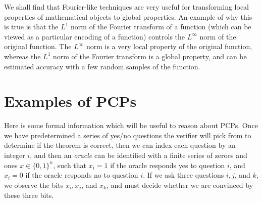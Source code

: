 \documentclass{article}
\theoremstyle{plain}
\theoremstyle{definition}
\begin{document}
We shall find that Fourier-like techniques are very useful for transforming local properties of mathematical objects to global properties. An example of why this is true is that the $L^1$ norm of the Fourier transform of a function (which can be viewed as a particular encoding of a function) controls the $L^\infty$ norm of the original function. The $L^\infty$ norm is a very local property of the original function, whereas the $L^1$ norm of the Fourier transform is a global property, and can be estimated accuracy with a few random samples of the function.

\section{Examples of PCPs}

Here is some formal information which will be useful to reason about PCPs. Once we have predetermined a series of yes/no questions the verifier will pick from to determine if the theorem is correct, then we can index each question by an integer $i$, and then an {\it oracle} can be identified with a finite series of zeroes and ones $x \in \{ 0, 1 \}^n$, such that $x_i = 1$ if the oracle responds yes to question $i$, and $x_i = 0$ if the oracle responds no to question $i$. If we ask three questions $i,j$, and $k$, we observe the bits $x_i, x_j$, and $x_k$, and must decide whether we are convinced by these three bits.
\end{document}
